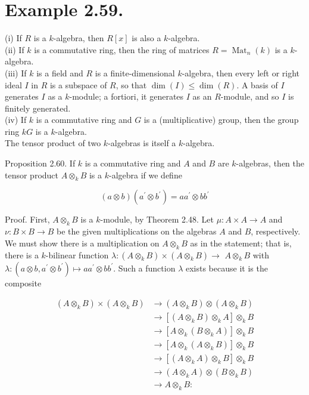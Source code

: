 \documentclass[10pt, letterpaper]{article}
\begin{document}
\section*{Example 2.59.}
(i) If $R$ is a $k$-algebra, then $R[x]$ is also a $k$-algebra.\\
(ii) If $k$ is a commutative ring, then the ring of matrices $R=\operatorname{Mat}_{n}(k)$ is a $k$-algebra.\\
(iii) If $k$ is a field and $R$ is a finite-dimensional $k$-algebra, then every left or right ideal $I$ in $R$ is a subspace of $R$, so that $\operatorname{dim}(I) \leq \operatorname{dim}(R)$. A basis of $I$ generates $I$ as a $k$-module; a fortiori, it generates $I$ as an $R$-module, and so $I$ is finitely generated.\\
(iv) If $k$ is a commutative ring and $G$ is a (multiplicative) group, then the group ring $k G$ is a $k$-algebra.\\
The tensor product of two $k$-algebras is itself a $k$-algebra.

Proposition 2.60. If $k$ is a commutative ring and $A$ and $B$ are $k$-algebras, then the tensor product $A \otimes_{k} B$ is a $k$-algebra if we define

$$
(a \otimes b)\left(a^{\prime} \otimes b^{\prime}\right)=a a^{\prime} \otimes b b^{\prime}
$$

Proof. First, $A \otimes_{k} B$ is a $k$-module, by Theorem 2.48. Let $\mu: A \times A \rightarrow A$ and $\nu: B \times B \rightarrow B$ be the given multiplications on the algebras $A$ and $B$, respectively. We must show there is a multiplication on $A \otimes_{k} B$ as in the statement; that is, there is a $k$-bilinear function $\lambda:\left(A \otimes_{k} B\right) \times\left(A \otimes_{k} B\right) \rightarrow$ $A \otimes_{k} B$ with $\lambda:\left(a \otimes b, a^{\prime} \otimes b^{\prime}\right) \mapsto a a^{\prime} \otimes b b^{\prime}$. Such a function $\lambda$ exists because it is the composite

$$
\begin{aligned}
\left(A \otimes_{k} B\right) \times\left(A \otimes_{k} B\right) & \rightarrow\left(A \otimes_{k} B\right) \otimes\left(A \otimes_{k} B\right) \\
& \rightarrow\left[\left(A \otimes_{k} B\right) \otimes_{k} A\right] \otimes_{k} B \\
& \rightarrow\left[A \otimes_{k}\left(B \otimes_{k} A\right)\right] \otimes_{k} B \\
& \rightarrow\left[A \otimes_{k}\left(A \otimes_{k} B\right)\right] \otimes_{k} B \\
& \rightarrow\left[\left(A \otimes_{k} A\right) \otimes_{k} B\right] \otimes_{k} B \\
& \rightarrow\left(A \otimes_{k} A\right) \otimes\left(B \otimes_{k} B\right) \\
& \rightarrow A \otimes_{k} B:
\end{aligned}
$$
\end{document}
